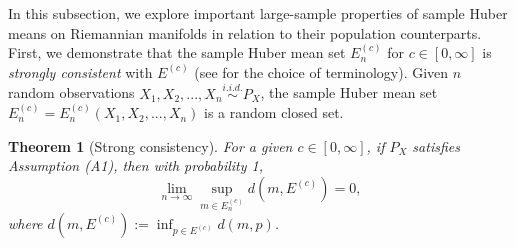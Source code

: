 \documentclass[preprint]{imsart}
\theoremstyle{plain}
\newtheorem{theorem}{Theorem}
\theoremstyle{remark}
\begin{document}
In this subsection, we explore important large-sample properties of sample Huber means on Riemannian manifolds in relation to their population counterparts. First, we demonstrate that the sample Huber mean set $E^{(c)}_{n}$ for $c \in [0, \infty]$ is \textit{strongly consistent} with $E^{(c)}$
(see \cite{huckemann2011intrinsic} for the choice of terminology). Given $n$ random observations $X_{1}, X_{2}, ..., X_{n} \overset{i.i.d.}{\sim} P_{X}$, the sample Huber mean set $E^{(c)}_{n}= E^{(c)}_{n}(X_{1}, X_{2}, ..., X_{n})$ is a random closed set.

\begin{theorem}[Strong consistency]\label{thm:slln} 
For a given $c \in [0, \infty]$, if $P_{X}$ satisfies Assumption (A1), then with probability 1,
\[
\lim_{n\rightarrow \infty}\sup_{m \in E^{(c)}_{n}} d(m, E^{(c)})=0,
\]
where $d(m, E^{(c)}):=\inf_{p \in E^{(c)}} d(m, p)$. 
\end{theorem}



\end{document}
